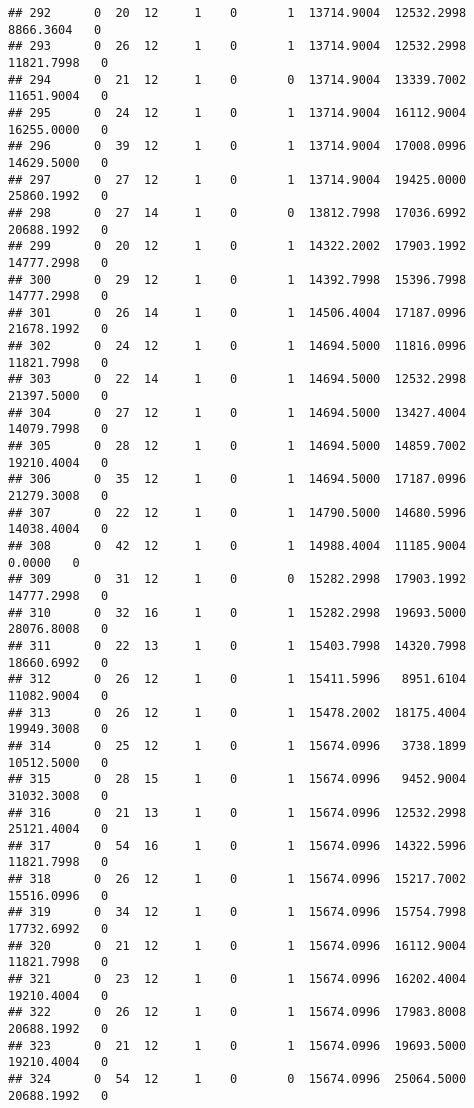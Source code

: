 \documentclass[
]{article}
\begin{document}
\begin{enumerate}
\begin{verbatim}
## 292      0  20  12     1    0       1  13714.9004  12532.2998   8866.3604   0
## 293      0  26  12     1    0       1  13714.9004  12532.2998  11821.7998   0
## 294      0  21  12     1    0       0  13714.9004  13339.7002  11651.9004   0
## 295      0  24  12     1    0       1  13714.9004  16112.9004  16255.0000   0
## 296      0  39  12     1    0       1  13714.9004  17008.0996  14629.5000   0
## 297      0  27  12     1    0       1  13714.9004  19425.0000  25860.1992   0
## 298      0  27  14     1    0       0  13812.7998  17036.6992  20688.1992   0
## 299      0  20  12     1    0       1  14322.2002  17903.1992  14777.2998   0
## 300      0  29  12     1    0       1  14392.7998  15396.7998  14777.2998   0
## 301      0  26  14     1    0       1  14506.4004  17187.0996  21678.1992   0
## 302      0  24  12     1    0       1  14694.5000  11816.0996  11821.7998   0
## 303      0  22  14     1    0       1  14694.5000  12532.2998  21397.5000   0
## 304      0  27  12     1    0       1  14694.5000  13427.4004  14079.7998   0
## 305      0  28  12     1    0       1  14694.5000  14859.7002  19210.4004   0
## 306      0  35  12     1    0       1  14694.5000  17187.0996  21279.3008   0
## 307      0  22  12     1    0       1  14790.5000  14680.5996  14038.4004   0
## 308      0  42  12     1    0       1  14988.4004  11185.9004      0.0000   0
## 309      0  31  12     1    0       0  15282.2998  17903.1992  14777.2998   0
## 310      0  32  16     1    0       1  15282.2998  19693.5000  28076.8008   0
## 311      0  22  13     1    0       1  15403.7998  14320.7998  18660.6992   0
## 312      0  26  12     1    0       1  15411.5996   8951.6104  11082.9004   0
## 313      0  26  12     1    0       1  15478.2002  18175.4004  19949.3008   0
## 314      0  25  12     1    0       1  15674.0996   3738.1899  10512.5000   0
## 315      0  28  15     1    0       1  15674.0996   9452.9004  31032.3008   0
## 316      0  21  13     1    0       1  15674.0996  12532.2998  25121.4004   0
## 317      0  54  16     1    0       1  15674.0996  14322.5996  11821.7998   0
## 318      0  26  12     1    0       1  15674.0996  15217.7002  15516.0996   0
## 319      0  34  12     1    0       1  15674.0996  15754.7998  17732.6992   0
## 320      0  21  12     1    0       1  15674.0996  16112.9004  11821.7998   0
## 321      0  23  12     1    0       1  15674.0996  16202.4004  19210.4004   0
## 322      0  26  12     1    0       1  15674.0996  17983.8008  20688.1992   0
## 323      0  21  12     1    0       1  15674.0996  19693.5000  19210.4004   0
## 324      0  54  12     1    0       0  15674.0996  25064.5000  20688.1992   0

\end{verbatim}
\end{enumerate}
\end{document}
